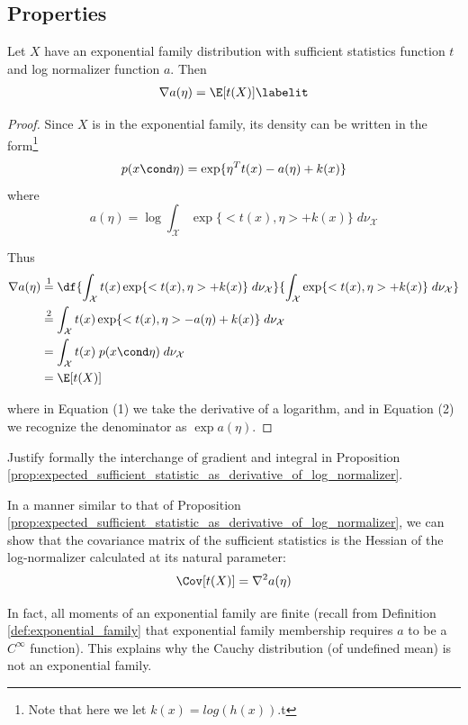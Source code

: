 \documentclass{article} %
\begin{document}
\subsection{Properties}

\begin{proposition}
Let $X$ have an exponential family distribution with sufficient statistics function $t$ and log normalizer function $a$.   Then  
\begin{align*}
\nabla a(\eta) = \E[t(X)] 
\labelit \label{eqn:expected_sufficient_statistic_as_derivative_of_log_normalizer}	
\end{align*}

\begin{proof}

Since $X$ is in the exponential family, its density can be written in the form\footnote{Note that here we let $k(x) = log(h(x))$.t}  
 \[ p(x \cond \eta) =  \exp \{ \eta^T t(x) - a(\eta) + k(x)\} \] 
where 
\[a(\eta) = \log \int_{\mathcal{X}} \exp \{ <t(x), \eta> + k(x) \} \; d\nu_{\mathcal{X}} \] 

Thus
\begin{align*}
\nabla a (\eta) & \stackrel{1}{=}  \df{ \int_{\mathcal{X}} t(x)  \exp \{ <t(x), \eta> + k(x) \} \; d\nu_{\mathcal{X}} }{\int_{\mathcal{X}} \exp \{ <t(x), \eta> + k(x) \} \; d\nu_{\mathcal{X}} } \\
& \stackrel{2}{=} \int_{\mathcal{X}} t(x)  \exp \{ <t(x), \eta> - a(\eta) + k(x) \} \; d\nu_{\mathcal{X}}  \\
& = \int_{\mathcal{X}} t(x)  \; p(x \cond \eta) \; d\nu_{\mathcal{X}}  \\
&= \E[t(X)]
\end{align*}

where in  Equation (1) we take the derivative of a logarithm, and in Equation (2) we recognize the denominator as $\exp a(\eta)$.	
\end{proof}

\label{prop:expected_sufficient_statistic_as_derivative_of_log_normalizer}
\end{proposition}

\begin{task}
Justify formally the interchange of gradient and integral in Proposition \ref{prop:expected_sufficient_statistic_as_derivative_of_log_normalizer}.	
\end{task}

\begin{remark}
In a manner similar to that of Proposition \ref{prop:expected_sufficient_statistic_as_derivative_of_log_normalizer}, we can show that the covariance matrix of the sufficient statistics is the Hessian of the log-normalizer calculated at its natural parameter:
\[ \Cov[t(X)] = \nabla^2 a(\eta) \]	

In fact, all moments of an exponential family are finite (recall from Definition \ref{def:exponential_family} that exponential family membership requires $a$ to be a $C^\infty$ function).  This explains why the Cauchy distribution (of undefined mean) is not an exponential family.
\end{remark}
\end{document}
